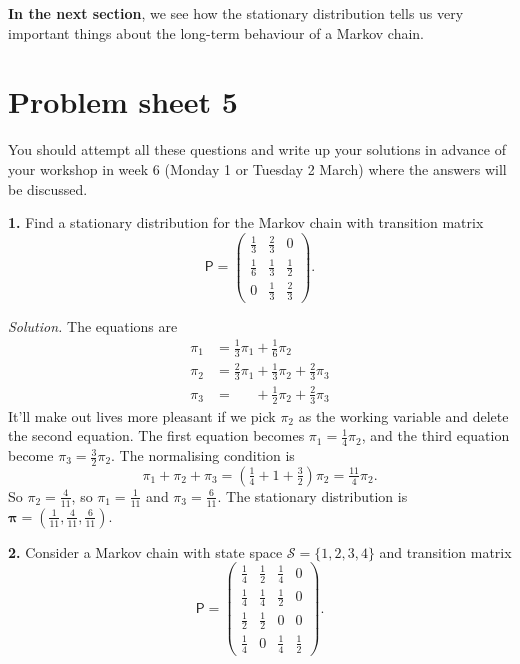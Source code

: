 \documentclass[
  a4paper,
]{article}
\newif\ifcomm\commtrue
\theoremstyle{definition}
\theoremstyle{definition}
\theoremstyle{definition}
\theoremstyle{remark}
\begin{document}
\textbf{In the next section}, we see how the stationary distribution tells us very important things about the long-term behaviour of a Markov chain.

\hypertarget{P05}{%
\section*{Problem sheet 5}\label{P05}}

\commfalse

You should attempt all these questions and write up your solutions in advance of your workshop in week 6 (Monday 1 or Tuesday 2 March) where the answers will be discussed.

\textbf{1.} Find a stationary distribution for the Markov chain with transition matrix
\[ \mathsf P = \begin{pmatrix} \frac13 & \frac23 & 0 \\
                               \frac16 & \frac13 & \frac12 \\
                               0 & \frac13 & \frac23 \end{pmatrix} . \]

\begin{myanswers}

\emph{Solution.} The equations are
\begin{align*}
\pi_1 &= \tfrac13 \pi_1 + \tfrac16 \pi_2 \\
\pi_2 &= \tfrac23 \pi_1 + \tfrac13 \pi_2 + \tfrac23 \pi_3 \\
\pi_3 &= \phantom{\tfrac23 \pi_1} + \tfrac12 \pi_2 + \tfrac23 \pi_3
\end{align*}
It'll make out lives more pleasant if we pick \(\pi_2\) as the working variable and delete the second equation. The first equation becomes \(\pi_1 = \tfrac14 \pi_2\), and the third equation become \(\pi_3 = \tfrac32 \pi_2\). The normalising condition is
\[ \pi_1 + \pi_2 + \pi_3 = \left( \tfrac14 + 1 + \tfrac32\right) \pi_2 = \tfrac{11}{4} \pi_2 .    \]
So \(\pi_2 = \frac4{11}\), so \(\pi_1 = \frac{1}{11}\) and \(\pi_3 = \frac{6}{11}\). The stationary distribution is \(\boldsymbol\pi = (\frac{1}{11}, \frac{4}{11}, \frac{6}{11})\).

\end{myanswers}

\textbf{2.} Consider a Markov chain with state space \(\mathcal S = \{1,2,3,4\}\) and transition matrix
\[  \mathsf P = \begin{pmatrix} \frac14 & \frac12 &\frac14 & 0 \\
                      \frac14 & \frac14 & \frac12 & 0 \\
                      \frac12 & \frac12 & 0 & 0 \\
                      \frac14 & 0       &\frac14 & \frac 12
                      \end{pmatrix} . \]
\end{document}
